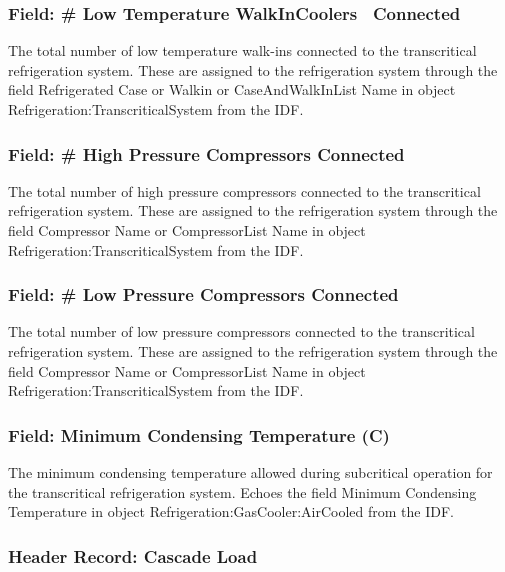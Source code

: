 \subsubsection{Field: \# Low Temperature WalkInCoolers~ Connected}\label{field-low-temperature-walkincoolers-connected}

The total number of low temperature walk-ins connected to the transcritical refrigeration system. These are assigned to the refrigeration system through the field Refrigerated Case or Walkin or CaseAndWalkInList Name in object Refrigeration:TranscriticalSystem from the IDF.

\subsubsection{Field: \# High Pressure Compressors Connected}\label{field-high-pressure-compressors-connected}

The total number of high pressure compressors connected to the transcritical refrigeration system. These are assigned to the refrigeration system through the field Compressor Name or CompressorList Name in object Refrigeration:TranscriticalSystem from the IDF.

\subsubsection{Field: \# Low Pressure Compressors Connected}\label{field-low-pressure-compressors-connected}

The total number of low pressure compressors connected to the transcritical refrigeration system. These are assigned to the refrigeration system through the field Compressor Name or CompressorList Name in object Refrigeration:TranscriticalSystem from the IDF.

\subsubsection{Field: Minimum Condensing Temperature (C)}\label{field-minimum-condensing-temperature-c-1}

The minimum condensing temperature allowed during subcritical operation for the transcritical refrigeration system. Echoes the field Minimum Condensing Temperature in object Refrigeration:GasCooler:AirCooled from the IDF.

\subsubsection{Header Record: Cascade Load}\label{header-record-cascade-load}

